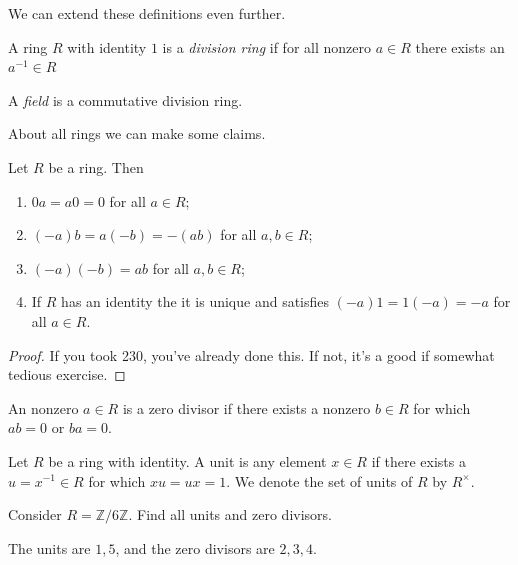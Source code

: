 We can extend these definitions even further.

\begin{definition}
A ring $R$ with identity $1$ is a \emph{division ring} if for all nonzero $a \in R$ there exists an $a^{-1} \in R$
\end{definition}

\begin{definition}[Field]
A \emph{field} is a commutative division ring.
\end{definition}

About all rings we can make some claims.

\begin{proposition}
Let $R$ be a ring. Then
\begin{enumerate}
\item $0a = a0 = 0$ for all $a \in R$;
\item $(-a)b = a(-b) = -(ab)$ for all $a,b \in R$;
\item $(-a)(-b) = ab$ for all $a,b \in R$;
\item If $R$ has an identity the it is unique and satisfies $(-a)1 = 1(-a) = -a$ for all $a \in R$.
\end{enumerate}
\end{proposition}

\begin{proof}
If you took 230, you've already done this. If not, it's a good if somewhat tedious exercise.
\end{proof}

\begin{definition}
An nonzero $a \in R$ is a zero divisor if there exists a nonzero $b \in R$ for which $ab = 0$ or $ba = 0$.
\end{definition}

\begin{definition}[Unit]
Let $R$ be a ring with identity. A unit is any element $x \in R$ if there exists a $u = x^{-1} \in R$ for which $xu = ux = 1$. We denote the set of units of $R$ by $R^\times$.
\end{definition}

\begin{example}
Consider $R = \mathbb{Z}/6\mathbb{Z}$. Find all units and zero divisors.
\end{example}

\begin{solution}
The units are $1,5$, and the zero divisors are $2,3,4$.
\end{solution}

